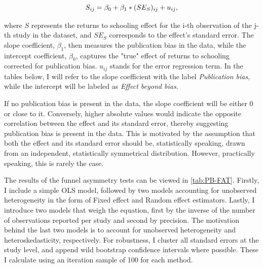 \begin{equation}\label{eq:fat_reg}
    S_{ij} = \beta_0 + \beta_1 * (SE_{S})_{ij} + u_{ij},
    \vspace{0.3cm}
\end{equation}

where $S$ represents the returns to schooling effect for the i-th observation of the j-th study in the dataset, and $SE_{S}$ corresponds to the effect's standard error. The slope coefficient, $\beta_1$, then measures the publication bias in the data, while the intercept coefficient, $\beta_0$, captures the "true" effect of returns to schooling corrected for publication bias. $u_{ij}$ stands for the error regression term. In the tables below, I will refer to the slope coefficient with the label \textit{Publication bias}, while the intercept will be labeled as \textit{Effect beyond bias}.

If no publication bias is present in the data, the slope coefficient will be either 0 or close to it. Conversely, higher absolute values would indicate the opposite correlation between the effect and its standard error, thereby suggesting publication bias is present in the data. This is motivated by the assumption that both the effect and its standard error should be, statistically speaking, drawn from an independent, statistically symmetrical distribution. However, practically speaking, this is rarely the case. 

The results of the funnel asymmetry tests can be viewed in \autoref{tab:PB-FAT}. Firstly, I include a simple \ac{OLS} model, followed by two models accounting for unobserved heterogeneity in the form of Fixed effect and Random effect estimators. Lastly, I introduce two models that weigh the equation, first by the inverse of the number of observations reported per study and second by precision. The motivation behind the last two models is to account for unobserved heterogeneity and heteroskedasticity, respectively. For robustness, I cluster all standard errors at the study level, and append wild bootstrap confidence intervals where possible. These I calculate using an iteration sample of 100 for each method.

